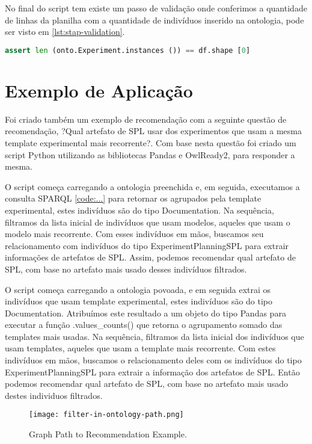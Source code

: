 No final do script tem existe um passo de validação onde conferimos a quantidade de linhas da planilha com a quantidade de indivíduos inserido na ontologia, pode ser visto em \ref{lst:stap-validation}.

\begin{lstlisting}[language=Python, caption=Stap validation, label=lst:stap-validation]
assert len (onto.Experiment.instances ()) == df.shape [0]
\end{lstlisting}

\section{Exemplo de Aplicação}
\label{sec:exemplo}

Foi criado também um exemplo de recomendação com a seguinte questão de recomendação, ?Qual artefato de SPL usar dos experimentos que usam a mesma template experimental mais recorrente?. Com base nesta questão foi criado um script Python utilizando as bibliotecas Pandas e OwlReady2, para responder a mesma.

O script começa carregando a ontologia preenchida e, em seguida, executamos a consulta SPARQL \ref{code:...} para retornar os agrupados pela template experimental, estes indivíduos são do tipo Documentation. Na sequência, filtramos da lista inicial de indivíduos que usam modelos, aqueles que usam o modelo mais recorrente. Com esses indivíduos em mãos, buscamos seu relacionamento com indivíduos do tipo ExperimentPlanningSPL para extrair informações de artefatos de SPL. Assim, podemos recomendar qual artefato de SPL, com base no artefato mais usado desses indivíduos filtrados.

O script começa carregando a ontologia povoada, e em seguida extrai os indivíduos que usam template experimental, estes indivíduos são do tipo Documentation. Atribuímos este resultado a um objeto do tipo Pandas para executar a função .values\_counts() que retorna o agrupamento somado das templates mais usadas. Na sequência, filtramos da lista inicial dos indivíduos que usam templates, aqueles que usam a template mais recorrente. Com estes indivíduos em mãos, buscamos o relacionamento deles com os indivíduos do tipo ExperimentPlanningSPL para extrair a informação dos artefatos de SPL. Então podemos recomendar qual artefato de SPL, com base no artefato mais usado destes individuos filtrados.

\begin{figure}[ht]
 	\centering 
 	\texttt{[image: filter-in-ontology-path.png]}
 	\caption{Graph Path to Recommendation Example.}
 	\label{figure:graph_path_to_recomendation}
 \end{figure}

